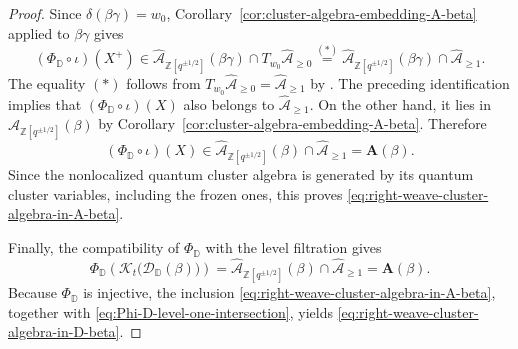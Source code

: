 \documentclass[12pt, reqno]{amsart}
\theoremstyle{plain}
\theoremstyle{definition}
\numberwithin{equation}{section}
\newcommand{\ZZ}{\mathbb{Z}}
\newcommand{\DD}{\mathbb{D}}
\newcommand{\cA}{\mathcal{A}}
\begin{document}
\begin{proof}
Since $\delta(\beta\gamma)=w_0$,
Corollary~\ref{cor:cluster-algebra-embedding-A-beta} applied to
$\beta\gamma$ gives
\begin{equation*}
    (\Phi_{\DD}\circ\iota)(X^+)
    \in
    \widehat{\cA}_{\ZZ[q^{\pm1/2}]}(\beta\gamma)
    \cap T_{w_0}\widehat{\cA}_{\geq0}
    \stackrel{(*)}{=}
    \widehat{\cA}_{\ZZ[q^{\pm1/2}]}(\beta\gamma)
    \cap\widehat{\cA}_{\geq1}.
\end{equation*}
The equality \((*)\) follows from
\(T_{w_0}\widehat{\cA}_{\geq0}=\widehat{\cA}_{\geq1}\) by
\cite[Lemma~4.4]{oh2025pbw}.
The preceding identification implies that
$(\Phi_{\DD}\circ\iota)(X)$ also belongs to
$\widehat{\cA}_{\geq 1}$. On the other hand, it lies in
$\widehat{\cA}_{\ZZ[q^{\pm1/2}]}(\beta)$ by Corollary~\ref{cor:cluster-algebra-embedding-A-beta}.
Therefore
\begin{equation*}
    (\Phi_{\DD}\circ\iota)(X)
    \in
    \widehat{\cA}_{\ZZ[q^{\pm1/2}]}(\beta)\cap\widehat{\cA}_{\geq 1}
    =\mathbf A(\beta).
\end{equation*}
Since the nonlocalized quantum cluster algebra is generated by its
quantum cluster variables, including the frozen ones, this proves
\eqref{eq:right-weave-cluster-algebra-in-A-beta}.

Finally, the compatibility of $\Phi_{\DD}$ with the level filtration
gives
\begin{equation}\label{eq:Phi-D-level-one-intersection}
    \Phi_{\DD}\!
    \left(
        \mathcal{K}_t\bigl(\mathscr D_{\DD}(\beta)\bigr)
    \right)
    =
    \widehat{\cA}_{\ZZ[q^{\pm1/2}]}(\beta)\cap\widehat{\cA}_{\geq 1}
    =
    \mathbf A(\beta).
\end{equation}
Because $\Phi_{\DD}$ is injective, the inclusion
\eqref{eq:right-weave-cluster-algebra-in-A-beta}, together with
\eqref{eq:Phi-D-level-one-intersection}, yields
\eqref{eq:right-weave-cluster-algebra-in-D-beta}.
\end{proof}
\end{document}
